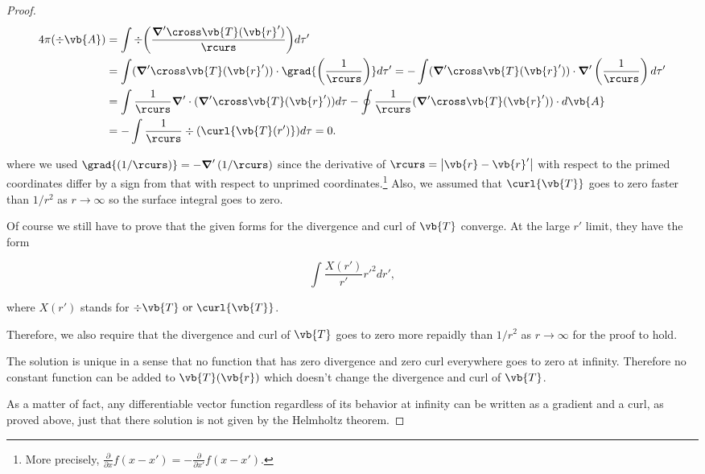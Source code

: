 \documentclass[english,a4paper,12pt]{report}
\begin{document}
\begin{proof}
\begin{equation}
	\begin{aligned}
		4\pi (\div{\vb{A} } ) &= \int \div{\left(\frac{\boldsymbol{\nabla}' \cross \vb{T} (\vb{r} ')}{\rcurs }\right)} d\tau ' \\ 
		&= \int (\boldsymbol{\nabla}' \cross \vb{T} (\vb{r} ')) \cdot \grad{\left(\frac{1}{\rcurs } \right)} d\tau ' = -\int (\boldsymbol{\nabla}' \cross \vb{T} (\vb{r} ')) \cdot \boldsymbol{\nabla}'\left(\frac{1}{\rcurs } \right) d\tau ' \\
		&= \int \frac{1}{\rcurs }\boldsymbol{\nabla}' \cdot (\boldsymbol{\nabla}' \cross \vb{T} (\vb{r} ')) d\tau  - \oint \frac{1}{\rcurs } (\boldsymbol{\nabla}' \cross \vb{T} (\vb{r} ')) \cdot d\vb{A}  \\
        &= - \int \frac{1}{\rcurs } \div{(\curl{\vb{T} (r')} )} d\tau = 0.  	
	\end{aligned}
\end{equation}

where we used \( \grad{\left(1 /\rcurs \right)} = - \boldsymbol{\nabla}'\left(1/\rcurs  \right) \) since the derivative of \(\rcurs = \left| \vb{r} - \vb{r} ' \right| \) with respect to the primed coordinates differ by a sign from that with respect to unprimed coordinates.\footnote{More precisely, \(\frac{\partial }{\partial x} f(x-x') = - \frac{\partial }{\partial x'} f(x-x')\).} Also, we assumed that \(\curl{\vb{T} } \) goes to zero faster than \(1 /r^2 \) as \(r \to  \infty\) so the surface integral goes to zero.    

Of course we still have to prove that the given forms for the divergence and curl of \(\vb{T} \) converge. At the large \(r'\) limit, they have the form

\begin{equation}
	\int \frac{X(r')}{r'}r'^2 dr', 
\end{equation}

where \(X(r')\) stands for \(\div{\vb{T} } \text { or } \curl{\vb{T} }\).   

Therefore, we also require that the divergence and curl of \(\vb{T} \) goes to zero more repaidly than \(1 /r^2 \) as \(r \to  \infty\) for the proof to hold. 

The solution is unique in a sense that no function that has zero divergence and zero curl everywhere goes to zero at infinity. Therefore no constant function can be added to \(\vb{T} (\vb{r} )\) which doesn't change the divergence and curl of \(\vb{T} \). 

As a matter of fact, any differentiable vector function regardless of its behavior at infinity can be written as a gradient and a curl, as proved above, just that there solution is not given by the Helmholtz theorem.

\end{proof}
\end{document}
